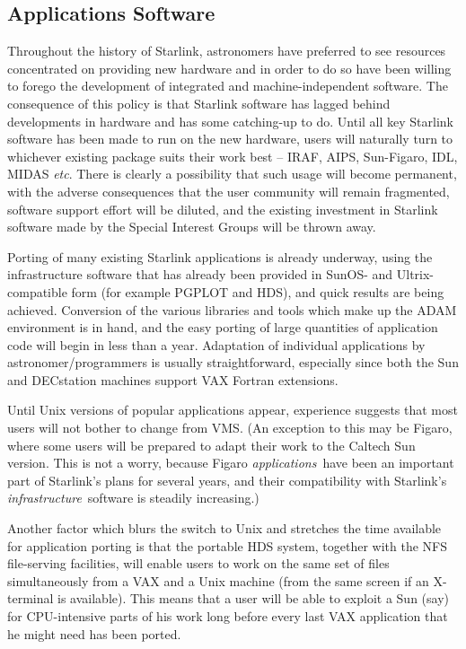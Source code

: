 \subsection{Applications Software}
Throughout the history of Starlink, astronomers have preferred to see
resources concentrated on providing new hardware and in order to do so
have been willing to forego the development of integrated and
machine-independent software.  The consequence of this policy is that
Starlink software has lagged behind developments in hardware and has
some catching-up to do.  Until all key Starlink software has been made
to run on the new hardware, users will naturally turn to whichever
existing package suits their work best -- IRAF, AIPS, Sun-Figaro, IDL,
MIDAS {\it etc}.  There is clearly a possibility that such usage will
become permanent, with the adverse consequences that the user community
will remain fragmented, software support effort will be diluted, and the
existing investment in Starlink software made by the Special Interest
Groups will be thrown away.

Porting of many existing Starlink applications is already underway,
using the infrastructure software that has already been provided in
SunOS- and Ultrix-compatible form (for example PGPLOT and HDS), and
quick results are being achieved.  Conversion of the various libraries
and tools which make up the ADAM environment is in hand, and the easy
porting of large quantities of application code will begin in less than
a year.  Adaptation of individual applications by astronomer/programmers
is usually straightforward, especially since both the Sun and DECstation
machines support VAX Fortran extensions.

Until Unix versions of popular applications appear, experience suggests
that most users will not bother to change from VMS.  (An exception to
this may be Figaro, where some users will be prepared to adapt their
work to the Caltech Sun version.  This is not a worry, because Figaro
{\it applications}\, have been an important part of Starlink's plans
for several years, and their compatibility with Starlink's
{\it infrastructure}\, software is steadily increasing.)

Another factor which blurs the switch to Unix and stretches the time
available for application porting is that the portable HDS system,
together with the NFS file-serving facilities, will enable users to work
on the same set of files simultaneously from a VAX and a Unix machine
(from the same screen if an X-terminal is available).  This means that a
user will be able to exploit a Sun (say) for CPU-intensive parts of his
work long before every last VAX application that he might need has been
ported.

